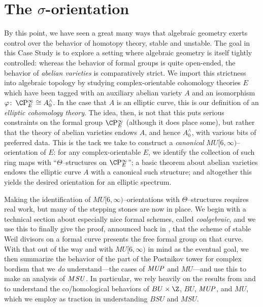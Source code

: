 
\chapter{The \texorpdfstring{\(\sigma\)}{sigma}-orientation}\label{ChapterSigmaOrientation}

By this point, we have seen a great many ways that algebraic geometry exerts control over the behavior of homotopy theory, stable and unstable.
The goal in this Case Study is to explore a setting where algebraic geometry is itself tightly controlled: whereas the behavior of formal groups is quite open-ended, the behavior of \emph{abelian varieties} is comparatively strict.
We import this strictness into algebraic topology by studying complex-orientable cohomology theories \(E\) which have been tagged with an auxiliary abelian variety \(A\) and an isomorphism \(\phi\co \CP^\infty_E \cong A^\wedge_0\).
In the case that \(A\) is an elliptic curve, this is our definition of an \textit{elliptic cohomology theory}.
The idea, then, is not that this puts serious constraints on the formal group \(\CP^\infty_E\) (although it does place some), but rather that the theory of abelian varieties endows \(A\), and hence \(A^\wedge_0\), with various bits of preferred data.
This is the tack we take to construct a \emph{canonical} \(MU[6, \infty)\)--orientation of \(E\): for any complex-orientable \(E\), we identify the collection of such ring maps with ``\(\Theta\)--structures on \(\CP^\infty_E\)''; a basic theorem about abelian varieties endows the elliptic curve \(A\) with a canonical such structure; and altogether this yields the desired orientation for an elliptic spectrum.

Making the identification of \(MU[6, \infty)\)--orientations with \(\Theta\)--structures requires real work, but many of the stepping stones are now in place.
We begin with a technical section about especially nice formal schemes, called \textit{coalgebraic}, and we use this to finally give the proof, announced back in , that the scheme of stable Weil divisors on a formal curve presents the free formal group on that curve.
With that out of the way and with \(MU[6, \infty)\) in mind as the eventual goal, we then summarize the behavior of the part of the Postnikov tower for complex bordism that we \emph{do} understand---the cases of \(\mathit{MUP}\) and \(MU\)---and use this to make an analysis of \(M\mathit{SU}\).
In particular, we rely heavily on the results from  and  to understand the co/homological behaviors of \(BU \times \Z\), \(BU\), \(\mathit{MUP}\), and \(MU\), which we employ as traction in understanding \(BSU\) and \(MSU\).

